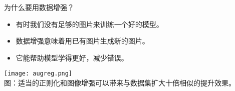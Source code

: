 \begin{refsection}
\begin{frame}{为什么要用数据增强？}
  \begin{minipage}{0.48\linewidth}
    \begin{itemize}
      \item 有时我们没有足够的图片来训练一个好的模型。
      \item 数据增强意味着用已有图片生成新的图片。
      \item 它能帮助模型学得更好，减少错误。
    \end{itemize}
  \end{minipage}%
  \hfill
  \begin{minipage}{0.48\linewidth}
    \centering
    \texttt{[image: augreg.png]}
    \scriptsize \\
    图：适当的正则化和图像增强可以带来与数据集扩大十倍相似的提升效果。~\parencite{steinerHowTrainYour2022}
  \end{minipage}
  \bottomleftrefs
\end{frame}
\end{refsection}

